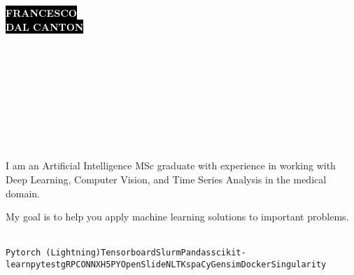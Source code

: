\documentclass[9pt]{developercv}
\begin{document}

\begin{minipage}[t]{0.45\textwidth}
    \vspace{-\baselineskip}
    \colorbox{black}{{\fontsize{26}{0}\textcolor{white}{\textbf{\MakeUppercase{Francesco}}}}}\\    
    \colorbox{black}{{\fontsize{26}{0}\textcolor{white}{\textbf{\MakeUppercase{Dal Canton}}}}}\\
\end{minipage}
\begin{minipage}[t]{0.27\textwidth}
    \vspace{-\baselineskip}
    \\
    \\
    \\
\end{minipage}
\begin{minipage}[t]{0.28\textwidth}
    \vspace{-\baselineskip}
    \\
    \\
    \\
\end{minipage}

\vspace{1.5cm}


\begin{minipage}[t]{0.45\textwidth}
    \vspace{-\baselineskip}
    \\
    I am an Artificial Intelligence MSc graduate with experience in working with Deep Learning, Computer Vision, and Time Series Analysis in the medical domain.
    
    My goal is to help you apply machine learning solutions to important problems.
\end{minipage}
\hfill
\begin{minipage}[t]{0.45\textwidth}
    \vspace{-\baselineskip}
    \\
    \texttt{Pytorch (Lightning)}\slashsep\texttt{Tensorboard}\slashsep\texttt{Slurm}\slashsep\texttt{Pandas}\slashsep\texttt{scikit-learn}\slashsep\texttt{pytest}\slashsep\texttt{gRPC}\slashsep\texttt{ONNX}\slashsep\texttt{H5PY}\slashsep\texttt{OpenSlide}\slashsep\texttt{NLTK}\slashsep\texttt{spaCy}\slashsep\texttt{Gensim}\slashsep\texttt{Docker}\slashsep\texttt{Singularity}
\end{minipage}
\end{document}
